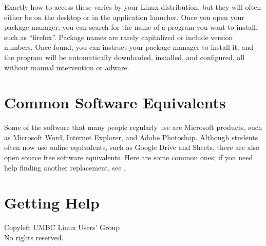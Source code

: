 \documentclass[11pt,notumble]{leaflet}
\begin{document}
Exactly how to access these varies by your Linux distribution, but they will
often either be on the desktop or in the application launcher. Once you open
your package manager, you can search for the name of a program you want to
install, such as ``firefox''. Package names are rarely capitalized or include
version numbers. Once found, you can instruct your package manager to install
it, and the program will be automatically downloaded, installed, and configured,
all without manual intervention or adware.


\section{Common Software Equivalents}
\label{section:common-software-equivalents}

Some of the software that many people regularly use are Microsoft products, such
as Microsoft Word, Internet Explorer, and Adobe Photoshop. Although students
often now use online equivalents, such as Google Drive and Sheets, there are
also open source free software equivalents. Here are some common ones; if you
need help finding another replacement, see .



\section{Getting Help}
\label{section:getting-help}

\vfill
\begin{center} \small 
    \textcopyleft{} Copyleft \the\year{} UMBC Linux Users' Group \\
    No rights reserved.
\end{center}
\end{document}
